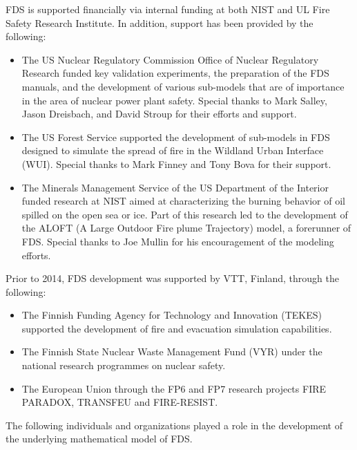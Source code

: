 \documentclass[11pt]{book}
\begin{document}
FDS is supported financially via internal funding at both NIST and UL Fire Safety Research Institute. In addition, support has been provided by the following:
\begin{itemize}
\item The US Nuclear Regulatory Commission Office of Nuclear Regulatory Research funded key validation experiments, the preparation of the FDS manuals, and the development of various sub-models that are of importance in the area of nuclear power plant safety. Special thanks to Mark Salley, Jason Dreisbach, and David Stroup for their efforts and support.
\item The US Forest Service supported the development of sub-models in FDS designed to simulate the spread of fire in the Wildland Urban Interface (WUI). Special thanks to Mark Finney and Tony Bova for their support.
\item The Minerals Management Service of the US Department of the Interior funded research at NIST aimed at characterizing the burning behavior of oil spilled on the open sea or ice. Part of this research led to the development of the ALOFT (A Large Outdoor Fire plume Trajectory) model, a forerunner of FDS. Special thanks to Joe Mullin for his encouragement of the modeling efforts.
\end{itemize}
\noindent Prior to 2014, FDS development was supported by VTT, Finland, through the following:
\begin{itemize}
\item The Finnish Funding Agency for Technology and Innovation (TEKES) supported the development of fire and evacuation simulation capabilities.
\item The Finnish State Nuclear Waste Management Fund (VYR) under the national research programmes on nuclear safety.
\item The European Union through the FP6 and FP7 research projects FIRE PARADOX, TRANSFEU and FIRE-RESIST.
\end{itemize}
The following individuals and organizations played a role in the development of the underlying mathematical model of FDS.
\end{document}
